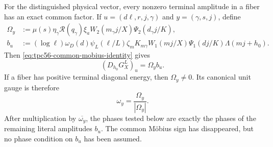 For the distinguished physical vector, every nonzero terminal amplitude
in a fiber has an exact common factor.  If \(u=(d\ell,r,j,\gamma)\) and
\(y=(\gamma,s,j)\), define
\begin{align}
 \Omega_y
 &:={}
 \mu(s)\eta_\gamma\mathscr R(q_\gamma)\xi_a
 W_2(m_\gamma j/X)\Psi_2(d_\gamma j/K),
 \label{eq:tpc56-common-output-gauge}\\
 b_u
 &:={}
 (\log\ell)\omega_D(d)\psi_L(\ell/L)\zeta_m
 K_{m\gamma}W_1(mj/X)\Psi_1(dj/K)
 \Lambda(mj+h_0).
 \label{eq:tpc56-remaining-amplitude}
\end{align}
Then \eqref{eq:tpc56-common-mobius-identity} gives
\begin{equation}
 (D_{h_0}G_X^L)_u=\Omega_y b_u.
 \label{eq:tpc56-physical-gauge-factorization}
\end{equation}
If a fiber has positive terminal diagonal energy, then \(\Omega_y\ne0\).
Its canonical unit gauge is therefore
\begin{equation}
 \omega_y=\frac{\Omega_y}{|\Omega_y|}.
 \label{eq:tpc56-unit-output-gauge}
\end{equation}
After multiplication by \(\overline{\omega_y}\), the phases tested below
are exactly the phases of the remaining literal amplitudes \(b_u\).  The
common M\"obius sign has disappeared, but no phase condition on \(b_u\) has
been assumed.
